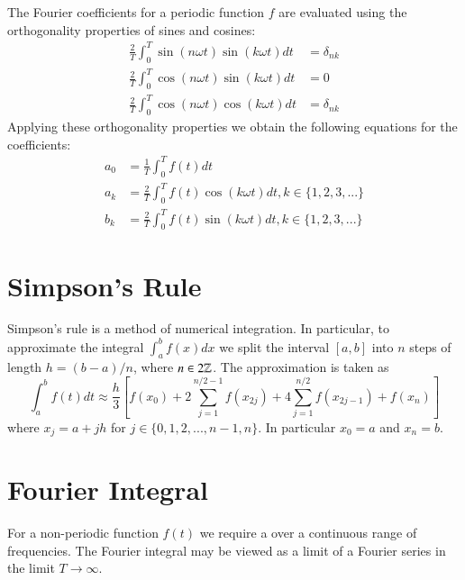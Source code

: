 \documentclass[12pt]{report}
\begin{document}
\begin{proc}{}{}
        The Fourier coefficients for a periodic function $f$ are evaluated using the orthogonality properties of sines and cosines:\begin{align}
                \frac{2}{T}\int_0^T\sin(n\omega t)\sin(k\omega t)dt &= \delta_{nk} \\
                \frac{2}{T}\int_0^T\cos(n\omega t)\sin(k\omega t)dt &= 0 \\
                \frac{2}{T}\int_0^T\cos(n\omega t)\cos(k\omega t)dt &= \delta_{nk}
        \end{align}
        Applying these orthogonality properties we obtain the following equations for the coefficients:\begin{align}
                a_0 &= \frac{1}{T}\int_0^Tf(t)dt \\
                a_k &= \frac{2}{T}\int_0^Tf(t)\cos(k\omega t)dt, k \in \{1,2,3,...\} \\
                b_k &= \frac{2}{T}\int_0^Tf(t)\sin(k\omega t)dt, k\in \{1,2,3,...\}
        \end{align}
\end{proc}


\section{Simpson's Rule}

\begin{proc}{}{}
        Simpson's rule is a method of numerical integration. In particular, to approximate the integral $\int_a^bf(x)dx$ we split the interval $[a,b]$ into $n$ steps of length $h = (b-a)/n$, where $n \in 2\mathbb Z$. The approximation is taken as \begin{equation}
                \int_a^bf(t)dt \approx \frac{h}{3}\left[ f(x_0) + 2\sum_{j=1}^{n/2-1}f(x_{2j}) + 4\sum_{j=1}^{n/2}f(x_{2j-1}) + f(x_n)\right]
        \end{equation}
        where $x_j = a + jh$ for $j \in \{0,1,2,...,n-1, n\}$. In particular $x_0 = a$ and $x_n = b$.
\end{proc}


\section{Fourier Integral}

\begin{rmk}{}{}
        For a non-periodic function $f(t)$ we require a  over a continuous range of frequencies. The Fourier integral may be viewed as a limit of a Fourier series in the limit $T\rightarrow \infty$.
\end{rmk}
\end{document}
